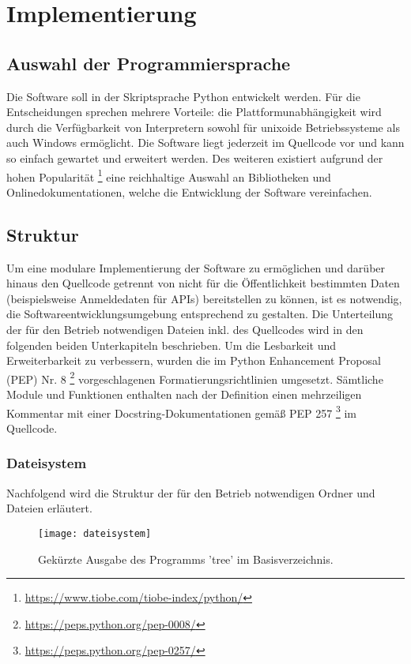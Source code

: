 \chapter{Implementierung}
\label{cha:implementierung}

\section{Auswahl der Programmiersprache}

Die Software soll in der Skriptsprache Python entwickelt werden. Für die Entscheidungen sprechen mehrere Vorteile: die Plattformunabhängigkeit wird durch die Verfügbarkeit von Interpretern sowohl für unixoide Betriebssysteme als auch Windows ermöglicht. Die Software liegt jederzeit im Quellcode vor und kann so einfach gewartet und erweitert werden. Des weiteren existiert aufgrund der hohen Popularität \footnote{\url{https://www.tiobe.com/tiobe-index/python/}} eine reichhaltige Auswahl an Bibliotheken und Onlinedokumentationen, welche die Entwicklung der Software vereinfachen. 

\section{Struktur}

Um eine modulare Implementierung der Software zu ermöglichen und darüber hinaus den Quellcode getrennt von nicht für die Öffentlichkeit bestimmten Daten (beispielsweise Anmeldedaten für APIs) bereitstellen zu können, ist es notwendig, die Softwareentwicklungsumgebung entsprechend zu gestalten. Die Unterteilung der für den Betrieb notwendigen Dateien inkl. des Quellcodes wird in den folgenden beiden Unterkapiteln beschrieben. Um die Lesbarkeit und Erweiterbarkeit zu verbessern, wurden die im Python Enhancement Proposal (PEP) Nr. 8 \footnote{\url{https://peps.python.org/pep-0008/}} vorgeschlagenen Formatierungsrichtlinien umgesetzt. Sämtliche Module und Funktionen enthalten nach der Definition einen mehrzeiligen Kommentar mit einer Docstring-Dokumentationen gemäß PEP 257 \footnote{\url{https://peps.python.org/pep-0257/}} im Quellcode.

\subsection{Dateisystem}

Nachfolgend wird die Struktur der für den Betrieb notwendigen Ordner und Dateien erläutert.

\begin{figure}[h!]
\centering
\texttt{[image: dateisystem]}
\caption{Gekürzte Ausgabe des Programms 'tree' im Basisverzeichnis.}
\label{fig:dateisystem}
\end{figure}

